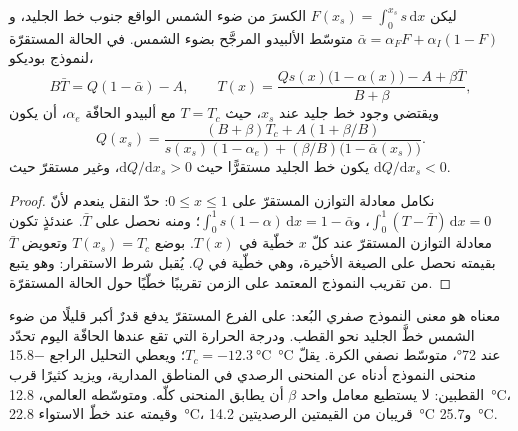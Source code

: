 \begin{proposition}\label{prop:b3:climate-models:iceline}
ليكن $F(x_s) = \int_0^{x_s}s\,\mathrm dx$ الكسرَ من ضوء الشمس الواقع
جنوب خط الجليد، و$\bar\alpha = \alpha_FF + \alpha_I(1 -
F)$ متوسّط الألبيدو المرجَّح بضوء الشمس. في الحالة المستقرّة لنموذج
بوديكو،
\[
B\bar T = Q(1 - \bar\alpha) - A, \qquad
T(x) = \frac{Qs(x)\big(1 - \alpha(x)\big) - A + \beta\bar T}{B + \beta} ,
\]
ويقتضي وجود خط جليد عند $x_s$، حيث $T = T_c$ مع ألبيدو الحافّة $\alpha_e$،
أن يكون
\[
Q(x_s) = \frac{(B + \beta)T_c + A(1 + \beta/B)}{s(x_s)(1 - \alpha_e) +
(\beta/B)\big(1 - \bar\alpha(x_s)\big)} .
\]
يكون خط الجليد مستقرًّا حيث $\mathrm dQ/\mathrm dx_s > 0$، وغير مستقرّ
حيث $\mathrm dQ/\mathrm dx_s < 0$.
\end{proposition}

\begin{proof}
نكامل معادلة التوازن المستقرّ على $0 \le x \le 1$: حدّ النقل
ينعدم لأنّ $\int_0^1(T - \bar T)\,\mathrm dx = 0$، و$\int_0^1
s(1 - \alpha)\,\mathrm dx = 1 - \bar\alpha$؛ ومنه نحصل على $\bar T$. عندئذٍ
تكون معادلة التوازن المستقرّ عند كلّ $x$ خطّية في $T(x)$. بوضع $T(x_s) = T_c$
وتعويض $\bar T$ بقيمته نحصل على الصيغة الأخيرة، وهي خطّية في $Q$.
يُقبل شرط الاستقرار: وهو يتبع من تقريب النموذج المعتمد على الزمن
تقريبًا خطّيًا حول الحالة المستقرّة.
\end{proof}

معناه هو معنى النموذج صفري البُعد: على الفرع المستقرّ
يدفع قدرٌ أكبر قليلًا من ضوء الشمس خطَّ الجليد نحو القطب. ودرجة الحرارة
التي تقع عندها الحافّة اليوم تحدّد $T_c = \qty{-12.3}{\celsius}$؛ ويعطي
التحليل الراجع \qty{-15.8}{\celsius} عند \ang{72}، متوسّط
نصفي الكرة. يقلّ منحنى النموذج أدناه عن المنحنى الرصدي في
المناطق المدارية، ويزيد كثيرًا قرب القطبين: لا يستطيع معامل واحد $\beta$
أن يطابق المنحنى كلّه. ومتوسّطه العالمي،
\qty{12.8}{\celsius}، وقيمته عند خطّ الاستواء \qty{22.8}{\celsius}، قريبان من
القيمتين الرصديتين \qty{14.2}{\celsius} و\qty{25.7}{\celsius}.

